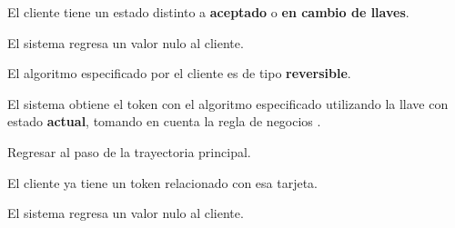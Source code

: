 {\begin{trayectoriaPrincipal}
  \end{trayectoriaPrincipal}

  \begin{trayectoriaAlternativa}
    {El cliente tiene un estado distinto a \textbf{aceptado} o
      \textbf{en cambio de llaves}.}

    \item El sistema regresa un valor nulo al cliente.

  \end{trayectoriaAlternativa}

  \begin{trayectoriaAlternativa}
    {El algoritmo especificado por el cliente es de tipo \textbf{reversible}.}

    \item El sistema obtiene el token con el algoritmo especificado utilizando
      la llave con estado \textbf{actual}, tomando en cuenta la regla de
      negocios .

    \item Regresar al paso  de la trayectoria
      principal.

  \end{trayectoriaAlternativa}

  \begin{trayectoriaAlternativa}
    {El cliente ya tiene un token relacionado con esa tarjeta.}

    \item El sistema regresa un valor nulo al cliente.

  \end{trayectoriaAlternativa}

}
